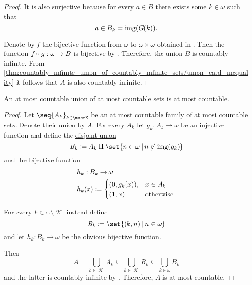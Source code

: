 \begin{proof}
  It is also surjective because for every \( a \in B \) there exists some \( k \in \omega \) such that
  \begin{equation*}
    a \in B_k = \operatorname{img}(G(k)).
  \end{equation*}

  Denote by \( f \) the bijective function from \( \omega \) to \( \omega \times \omega \) obtained in . Then the function \( f \bincirc g: \omega \to B \) is bijective by . Therefore, the union \( B \) is countably infinite. From \eqref{thm:countably_infinite_union_of_countably_infinite_sets/union_card_inequality} it follows that \( A \) is also countably infinite.
\end{proof}

\begin{corollary}\label{thm:at_most_countable_union_of_at_most_countable_sets}
  An \hyperref[def:set_countability/at_most_countable]{at most countable} union of at most countable sets is at most countable.
\end{corollary}
\begin{proof}
  Let \( \seq{ A_k }_{k \in \mscrK} \) be an at most countable family of at most countable sets. Denote their union by \( A \). For every \( A_k \) let \( g_k: A_k \to \omega \) be an injective function and define the \hyperref[def:disjoint_union]{disjoint union}
  \begin{equation*}
    B_k \coloneqq A_k \amalg \set{ n \in \omega \given n \not\in \img(g_k) }
  \end{equation*}
  and the bijective function
  \begin{equation*}
    \begin{aligned}
      &h_k: B_k \to \omega \\
      &h_k(x) \coloneqq \begin{cases}
        (0, g_k(x)), &x \in A_k \\
        (1, x),      &\T{otherwise.}
      \end{cases}
    \end{aligned}
  \end{equation*}

  For every \( k \in \omega \setminus \mscrK \) instead define
  \begin{equation*}
    B_k \coloneqq \set{ (k, n) \given n \in \omega }
  \end{equation*}
  and let \( h_k: B_k \to \omega \) be the obvious bijective function.

  Then
  \begin{equation*}
    A
    =
    \bigcup_{k \in \mscrK} A_k
    \subseteq
    \bigcup_{k \in \mscrK} B_k
    \subseteq
    \bigcup_{k \in \omega} B_k
  \end{equation*}
  and the latter is countably infinite by . Therefore, \( A \) is at most countable.
\end{proof}
